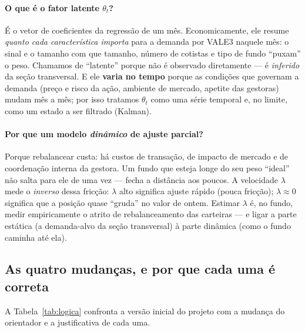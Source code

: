 \documentclass[11pt,a4paper]{article}
\begin{document}
\paragraph{O que é o fator latente $\theta_t$?} É o vetor de coeficientes da regressão de um mês.
Economicamente, ele resume \emph{quanto cada característica importa} para a demanda por VALE3
naquele mês: o sinal e o tamanho com que tamanho, número de cotistas e tipo de fundo ``puxam'' o
peso. Chamamos de ``latente'' porque não é observado diretamente --- é \emph{inferido} da seção
transversal. E ele \textbf{varia no tempo} porque as condições que governam a demanda (preço e
risco da ação, ambiente de mercado, apetite das gestoras) mudam mês a mês; por isso tratamos
$\theta_t$ como uma série temporal e, no limite, como um estado a ser filtrado (Kalman).

\paragraph{Por que um modelo \emph{dinâmico} de ajuste parcial?} Porque rebalancear custa: há
custos de transação, de impacto de mercado e de coordenação interna da gestora. Um fundo que esteja
longe do seu peso ``ideal'' não salta para ele de uma vez --- fecha a distância aos poucos. A
velocidade $\lambda$ mede o \emph{inverso} dessa fricção: $\lambda$ alto significa ajuste rápido
(pouca fricção); $\lambda\approx0$ significa que a posição quase ``gruda'' no valor de ontem.
Estimar $\lambda$ é, no fundo, medir empiricamente o atrito de rebalanceamento das carteiras --- e
ligar a parte estática (a demanda-alvo da seção transversal) à parte dinâmica (como o fundo caminha
até ela).

\subsection{As quatro mudanças, e por que cada uma é correta}

A Tabela~\ref{tab:logica} confronta a versão inicial do projeto com a mudança do orientador e a
justificativa de cada uma.
\end{document}
